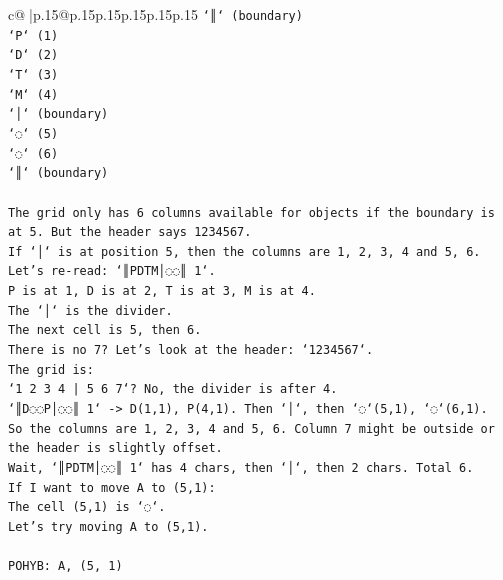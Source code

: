 \documentclass{article}
\begin{document}
{\begin{supertabular}{c@{$\;$}|p{.15\linewidth}@{}p{.15\linewidth}p{.15\linewidth}p{.15\linewidth}p{.15\linewidth}p{.15\linewidth}}
{{{\texttt{`║` (boundary)} \\
\texttt{`P` (1)} \\
\texttt{`D` (2)} \\
\texttt{`T` (3)} \\
\texttt{`M` (4)} \\
\texttt{`│` (boundary)} \\
\texttt{`◌` (5)} \\
\texttt{`◌` (6)} \\
\texttt{`║` (boundary)} \\
\\ 
\texttt{The grid only has 6 columns available for objects if the boundary is at 5. But the header says 1234567.} \\
\texttt{If `│` is at position 5, then the columns are 1, 2, 3, 4 and 5, 6.} \\
\texttt{Let's re{-}read: `║PDTM│◌◌║ 1`.} \\
\texttt{P is at 1, D is at 2, T is at 3, M is at 4.} \\
\texttt{The `│` is the divider.} \\
\texttt{The next cell is 5, then 6.} \\
\texttt{There is no 7? Let's look at the header: `1234567`.} \\
\texttt{The grid is:} \\
\texttt{`1 2 3 4 | 5 6 7`? No, the divider is after 4.} \\
\texttt{`║D◌◌P│◌◌║ 1` {-}> D(1,1), P(4,1). Then `│`, then `◌`(5,1), `◌`(6,1).} \\
\texttt{So the columns are 1, 2, 3, 4 and 5, 6. Column 7 might be outside or the header is slightly offset.} \\
\texttt{Wait, `║PDTM│◌◌║ 1` has 4 chars, then `│`, then 2 chars. Total 6.} \\
\texttt{If I want to move A to (5,1):} \\
\texttt{The cell (5,1) is `◌`.} \\
\texttt{Let's try moving A to (5,1).} \\
\\ 
\texttt{POHYB: A, (5, 1)} \\
            }
        }
    }
     \\ \\


\end{supertabular}}
\end{document}
